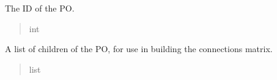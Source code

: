 \documentclass[letterpaper,10pt,english]{sphinxmanual}
\begin{document}
\begin{fulllineitems}

\begin{fulllineitems}
\label{\detokenize{nodes:nodes.nodeBuilder.PO.ID}}
\pysigstartsignatures
\pysigline
{}
\pysigstopsignatures
\sphinxAtStartPar
The ID of the PO.
\begin{quote}\begin{description}
\sphinxAtStartPar
int

\end{description}\end{quote}

\end{fulllineitems}


\begin{fulllineitems}
\label{\detokenize{nodes:nodes.nodeBuilder.PO.children}}
\pysigstartsignatures
\pysigline
{}
\pysigstopsignatures
\sphinxAtStartPar
A list of children of the PO, for use in building the connections matrix.
\begin{quote}\begin{description}
\sphinxAtStartPar
list

\end{description}\end{quote}

\end{fulllineitems}


\end{fulllineitems}

\end{document}
